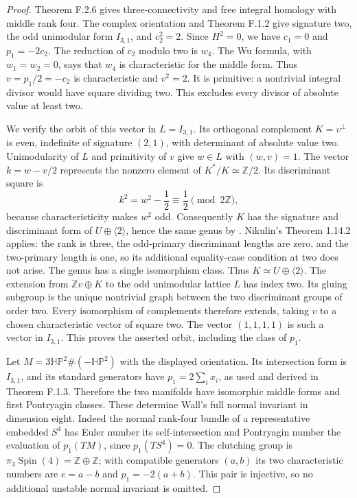 \begin{proof}
Theorem F.2.6 gives three-connectivity and free integral homology
with middle rank four.  The complex orientation and Theorem F.1.2
give signature two, the odd unimodular form $I_{3,1}$, and
$c_2^2=2$.  Since $H^2=0$, we have $c_1=0$ and
$p_1=-2c_2$.  The reduction of $c_2$ modulo two is $w_4$.
The Wu formula, with $w_1=w_2=0$, says that $w_4$ is characteristic
for the middle form.  Thus
$v=p_1/2=-c_2$ is characteristic and $v^2=2$.
It is primitive: a nontrivial integral divisor would have square
dividing two.  This excludes every divisor of absolute value
at least two.

We verify the orbit of this vector in $L=I_{3,1}$.
Its orthogonal complement $K=v^\perp$ is even, indefinite of
signature $(2,1)$, with determinant of absolute value two.
Unimodularity of $L$ and primitivity of $v$ give $w\in L$ with
$(w,v)=1$.  The vector $k=w-v/2$ represents the nonzero element
of $K^*/K\simeq\mathbb Z/2$.  Its discriminant square is
\[
 k^2=w^2-\frac12\equiv\frac12\pmod {2\mathbb Z},
 \tag{F.26}
\]
because characteristicity makes $w^2$ odd.
Consequently $K$ has the signature and discriminant form of
$U\oplus\langle2\rangle$, hence the same genus by
\cite[Corollary 1.9.4]{ffNikulin}.
Nikulin's Theorem 1.14.2 applies: the rank is three, the
odd-primary discriminant lengths are zero, and the two-primary
length is one, so its additional equality-case condition at two
does not arise.  The genus has a single isomorphism class.
Thus $K\simeq U\oplus\langle2\rangle$.
The extension from $\mathbb Zv\oplus K$ to the odd unimodular
lattice $L$ has index two.  Its gluing subgroup is the unique
nontrivial graph between the two discriminant groups of order
two.  Every isomorphism of complements therefore extends, taking
$v$ to a chosen characteristic vector of square two.
The vector $(1,1,1,1)$ is such a vector in $I_{3,1}$.
This proves the asserted orbit, including the class of $p_1$.

Let $M=3\mathbb H\mathbb P^2\#(-\mathbb H\mathbb P^2)$ with
the displayed orientation.  Its intersection form is $I_{3,1}$,
and its standard generators have $p_1=2\sum_i x_i$, as used
and derived in Theorem F.1.3.  Therefore the two manifolds have
isomorphic middle forms and first Pontryagin classes.
These determine Wall's full normal invariant in dimension eight.
Indeed the normal rank-four bundle of a representative embedded
$S^4$ has Euler number its self-intersection and Pontryagin
number the evaluation of $p_1(TM)$, since $p_1(TS^4)=0$.
The clutching group is
$\pi_3\operatorname{Spin}(4)=\mathbb Z\oplus\mathbb Z$;
with compatible generators $(a,b)$ its two characteristic
numbers are $e=a-b$ and $p_1=-2(a+b)$.
This pair is injective, so no additional unstable normal
invariant is omitted.


\end{proof}
